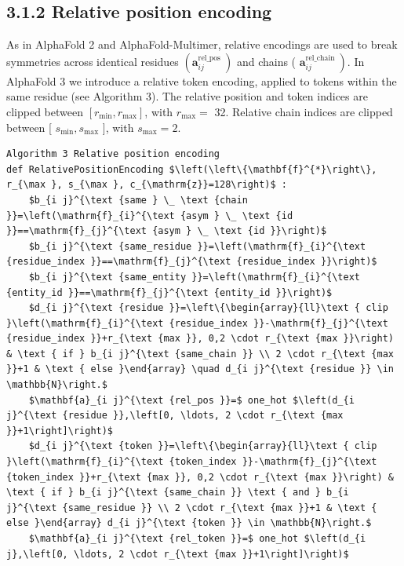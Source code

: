 \documentclass[10pt]{article}
\begin{document}
\subsection*{3.1.2 Relative position encoding}
As in AlphaFold 2 and AlphaFold-Multimer, relative encodings are used to break symmetries across identical residues $\left(\mathbf{a}_{i j}^{\text {rel_pos }}\right)$ and chains ( $\left.\mathbf{a}_{i j}^{\text {rel_chain }}\right)$. In AlphaFold 3 we introduce a relative token encoding, applied to tokens within the same residue (see Algorithm 3). The relative position and token indices are clipped between $\left[r_{\min }, r_{\max }\right]$, with $r_{\max }=$ 32. Relative chain indices are clipped between [ $s_{\min }, s_{\max }$ ], with $s_{\max }=2$.

\begin{verbatim}
Algorithm 3 Relative position encoding
def RelativePositionEncoding $\left(\left\{\mathbf{f}^{*}\right\}, r_{\max }, s_{\max }, c_{\mathrm{z}}=128\right)$ :
    $b_{i j}^{\text {same } \_ \text {chain }}=\left(\mathrm{f}_{i}^{\text {asym } \_ \text {id }}==\mathrm{f}_{j}^{\text {asym } \_ \text {id }}\right)$
    $b_{i j}^{\text {same_residue }}=\left(\mathrm{f}_{i}^{\text {residue_index }}==\mathrm{f}_{j}^{\text {residue_index }}\right)$
    $b_{i j}^{\text {same_entity }}=\left(\mathrm{f}_{i}^{\text {entity_id }}==\mathrm{f}_{j}^{\text {entity_id }}\right)$
    $d_{i j}^{\text {residue }}=\left\{\begin{array}{ll}\text { clip }\left(\mathrm{f}_{i}^{\text {residue_index }}-\mathrm{f}_{j}^{\text {residue_index }}+r_{\text {max }}, 0,2 \cdot r_{\text {max }}\right) & \text { if } b_{i j}^{\text {same_chain }} \\ 2 \cdot r_{\text {max }}+1 & \text { else }\end{array} \quad d_{i j}^{\text {residue }} \in \mathbb{N}\right.$
    $\mathbf{a}_{i j}^{\text {rel_pos }}=$ one_hot $\left(d_{i j}^{\text {residue }},\left[0, \ldots, 2 \cdot r_{\text {max }}+1\right]\right)$
    $d_{i j}^{\text {token }}=\left\{\begin{array}{ll}\text { clip }\left(\mathrm{f}_{i}^{\text {token_index }}-\mathrm{f}_{j}^{\text {token_index }}+r_{\text {max }}, 0,2 \cdot r_{\text {max }}\right) & \text { if } b_{i j}^{\text {same_chain }} \text { and } b_{i j}^{\text {same_residue }} \\ 2 \cdot r_{\text {max }}+1 & \text { else }\end{array} d_{i j}^{\text {token }} \in \mathbb{N}\right.$
    $\mathbf{a}_{i j}^{\text {rel_token }}=$ one_hot $\left(d_{i j},\left[0, \ldots, 2 \cdot r_{\text {max }}+1\right]\right)$

\end{verbatim}
\end{document}
